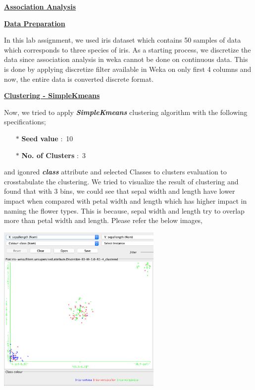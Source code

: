 \documentclass[a4paper,10pt]{article}
\begin{document}
\begin{center}
	\large\textbf{\underline{Association Analysis}} \par
\end{center} \par
\textbf{\underline{Data Preparation}} \par
In this lab assignment, we used iris dataset which contains 50 samples of data which corresponds to three species of
iris. As a starting process, we discretize the data since association analysis in weka cannot be done on continuous
data. This is done by applying discretize filter available in Weka on only first 4 columns and now, the entire data
is converted discrete format. \par
\textbf{\underline{Clustering - SimpleKmeans}} \par
Now, we tried to apply \textbf{\textit{SimpleKmeans}} clustering algorithm with the following specifications;
\begin{enumerate}
  \item[$*$] \textbf{Seed value} $:$ 10
  \item[$*$] \textbf{No. of Clusters} $:$ 3 
\end{enumerate}
and igonred \textbf{\textit{class}} attribute and selected Classes to clusters evaluation to crosstabulate the 
clustering. We tried to visualize the result of clustering and found that with 3 bins, we could see that sepal 
width and length have lower impact when compared with petal width and length which has higher impact in naming
the flower types. This is because, sepal width and length try to overlap more than petal width and length. Please
refer the below images,
\begin{center}
  \includegraphics[width=80mm,scale=0.10]{Sepal_dimension_visualization.png}
\end{center}
\end{document}
